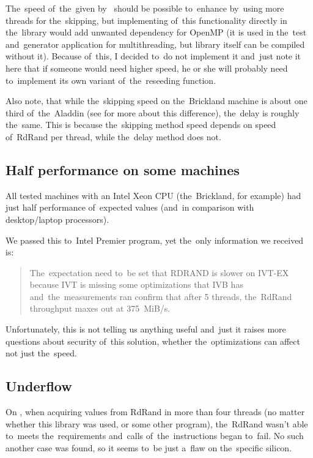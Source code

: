 \par{
The~speed of~the~given by~ should be possible to~enhance by~using more threads for the~skipping, but implementing of~this functionality directly in the~library would add unwanted dependency for OpenMP (it is used in the~test and~generator application for multithreading, but library itself can be compiled without it). Because of~this, I decided to~do not implement it and~just note it here that if someone would need higher speed, he or she will probably need to~implement its own variant of~the~reseeding function.
}

\par{
Also note, that while the~skipping speed on the~Brickland machine is about one third of~the~Aladdin (see  for more about this difference), the~delay is roughly the~same. This is because the~skipping method speed depends on speed of~RdRand per thread, while the~delay method does not.
}

\subsection{Half performance on some machines}\label{subsec:testing:halfPerf}

\par{All tested machines with an Intel Xeon CPU (the~Brickland, for example) had just half performance of~expected values (and~in comparison with desktop/laptop processors).
}

\par{
We passed this to~Intel Premier program, yet the~only information we received is:
\begin{quote}
The~expectation need to~be set that RDRAND is slower on IVT-EX 
because IVT is missing some optimizations that IVB has 
and~the~measurements ran confirm that after 5 threads, 
the~RdRand throughput maxes out at 375~MiB/s.
\end{quote}
Unfortunately, this is not telling us anything useful and~just it raises more 
questions about security of~this solution, whether the~optimizations can affect not just the~speed.
}

\subsection{Underflow}
\par{
On , when acquiring values from RdRand in more than four threads (no matter whether this library was used, or some other program), the~RdRand wasn't able to~meets the~requirements and~calls of~the~instructions began to~fail. No such another case was found, so it seems to~be just a~flaw on the~specific silicon.
}


